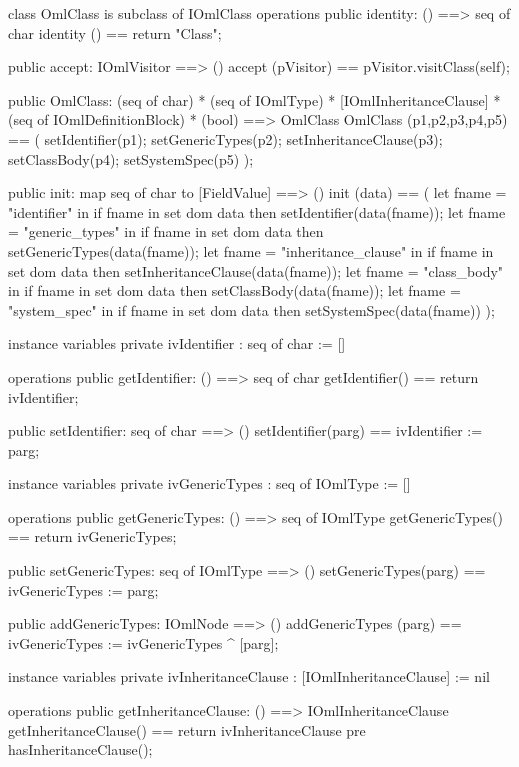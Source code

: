 \begin{vdm_al}
class OmlClass is subclass of IOmlClass
operations
  public identity: () ==> seq of char
  identity () == return "Class";

  public accept: IOmlVisitor ==> ()
  accept (pVisitor) == pVisitor.visitClass(self);

  public OmlClass:
      (seq of char) *
      (seq of IOmlType) *
      [IOmlInheritanceClause] *
      (seq of IOmlDefinitionBlock) *
      (bool) ==> OmlClass
  OmlClass (p1,p2,p3,p4,p5) == 
   ( setIdentifier(p1);
     setGenericTypes(p2);
     setInheritanceClause(p3);
     setClassBody(p4);
     setSystemSpec(p5) );

  public init: map seq of char to [FieldValue] ==> ()
  init (data) ==
    ( let fname = "identifier" in
        if fname in set dom data
        then setIdentifier(data(fname));
      let fname = "generic_types" in
        if fname in set dom data
        then setGenericTypes(data(fname));
      let fname = "inheritance_clause" in
        if fname in set dom data
        then setInheritanceClause(data(fname));
      let fname = "class_body" in
        if fname in set dom data
        then setClassBody(data(fname));
      let fname = "system_spec" in
        if fname in set dom data
        then setSystemSpec(data(fname)) );

instance variables
  private ivIdentifier : seq of char := []

operations
  public getIdentifier: () ==> seq of char
  getIdentifier() == return ivIdentifier;

  public setIdentifier: seq of char ==> ()
  setIdentifier(parg) == ivIdentifier := parg;

instance variables
  private ivGenericTypes : seq of IOmlType := []

operations
  public getGenericTypes: () ==> seq of IOmlType
  getGenericTypes() == return ivGenericTypes;

  public setGenericTypes: seq of IOmlType ==> ()
  setGenericTypes(parg) == ivGenericTypes := parg;

  public addGenericTypes: IOmlNode ==> ()
  addGenericTypes (parg) == ivGenericTypes := ivGenericTypes ^ [parg];

instance variables
  private ivInheritanceClause : [IOmlInheritanceClause] := nil

operations
  public getInheritanceClause: () ==> IOmlInheritanceClause
  getInheritanceClause() == return ivInheritanceClause
    pre hasInheritanceClause();


\end{vdm_al}

